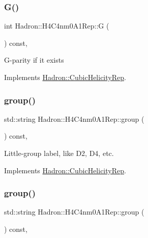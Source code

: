 \subsubsection{\texorpdfstring{G()}{G()}\hspace{0.1cm}{\footnotesize\ttfamily [3/3]}}
{\footnotesize\ttfamily int Hadron\+::\+H4\+C4nm0\+A1\+Rep\+::G (\begin{DoxyParamCaption}{ }\end{DoxyParamCaption}) const\hspace{0.3cm}{\ttfamily [inline]}, {\ttfamily [virtual]}}

G-\/parity if it exists 

Implements \mbox{\hyperlink{structHadron_1_1CubicHelicityRep_a50689f42be1e6170aa8cf6ad0597018b}{Hadron\+::\+Cubic\+Helicity\+Rep}}.

\mbox{\label{structHadron_1_1H4C4nm0A1Rep_ac03a34ff386fa824b479f98878531f7b}} 
\subsubsection{\texorpdfstring{group()}{group()}\hspace{0.1cm}{\footnotesize\ttfamily [1/5]}}
{\footnotesize\ttfamily std\+::string Hadron\+::\+H4\+C4nm0\+A1\+Rep\+::group (\begin{DoxyParamCaption}{ }\end{DoxyParamCaption}) const\hspace{0.3cm}{\ttfamily [inline]}, {\ttfamily [virtual]}}

Little-\/group label, like D2, D4, etc. 

Implements \mbox{\hyperlink{structHadron_1_1CubicHelicityRep_a101a7d76cd8ccdad0f272db44b766113}{Hadron\+::\+Cubic\+Helicity\+Rep}}.

\mbox{\label{structHadron_1_1H4C4nm0A1Rep_ac03a34ff386fa824b479f98878531f7b}} 
\subsubsection{\texorpdfstring{group()}{group()}\hspace{0.1cm}{\footnotesize\ttfamily [2/5]}}
{\footnotesize\ttfamily std\+::string Hadron\+::\+H4\+C4nm0\+A1\+Rep\+::group (\begin{DoxyParamCaption}{ }\end{DoxyParamCaption}) const\hspace{0.3cm}{\ttfamily [inline]}, {\ttfamily [virtual]}}

